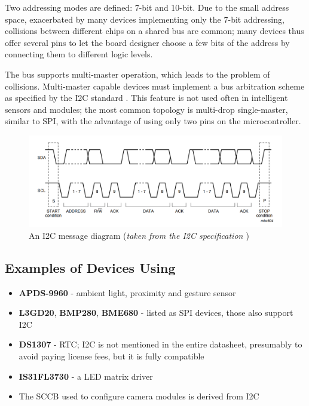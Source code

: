 Two addressing modes are defined: 7-bit and 10-bit. Due to the small address space, exacerbated by many devices implementing only the 7-bit addressing, collisions between different chips on a shared bus are common; many devices thus offer several pins to let the board designer choose a few bits of the address by connecting them to different logic levels. 

The bus supports multi-master operation, which leads to the problem of collisions. Multi-master capable devices must implement a bus arbitration scheme as specified by the \gls{I2C} standard \cite{i2c-spec}. This feature is not used often in intelligent sensors and modules; the most common topology is multi-drop single-master, similar to \gls{SPI}, with the advantage of using only two pins on the microcontroller.

\begin{figure}[h]
	\centering
	\includegraphics[width=.9\textwidth] {img/i2c-frame.png}
	\caption[\IIC message diagram]{\label{fig:i2c-frame}An \gls{I2C} message diagram (\textit{taken from the \gls{I2C} specification \cite{i2c-spec}})}
\end{figure}

\subsection{Examples of Devices Using \IIC}

\begin{itemize}
	\item \textbf{APDS-9960} - ambient light, proximity and gesture sensor
	\item \textbf{L3GD20}, \textbf{BMP280}, \textbf{BME680} - listed as \gls{SPI} devices, those also support \gls{I2C}
	\item \textbf{DS1307} - \gls{RTC}; \gls{I2C} is not mentioned in the entire datasheet, presumably to avoid paying license fees, but it is fully compatible
	\item \textbf{IS31FL3730} - a \gls{LED} matrix driver
	\item The \gls{SCCB} used to configure camera modules is derived from \gls{I2C}
\end{itemize}

